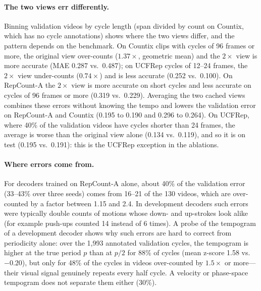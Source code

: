 \paragraph{The two views err differently.}
Binning validation videos by cycle length (span divided by count on Countix,
which has no cycle annotations) shows where the two views differ, and the
pattern depends on the benchmark. On Countix clips with cycles of 96 frames or
more, the original view over-counts ($1.37\times$, geometric mean) and the
$2\times$ view is more accurate (MAE 0.287 vs.\ 0.487); on UCFRep cycles of
12--24 frames, the $2\times$ view under-counts ($0.74\times$) and is less
accurate (0.252 vs.\ 0.100). On RepCount-A the $2\times$ view is more accurate
on short cycles and less accurate on cycles of 96 frames or more (0.319 vs.\
0.229). Averaging the two cached views combines these errors without knowing
the tempo and lowers the validation error on RepCount-A and Countix (0.195 to
0.190 and 0.296 to 0.264). On UCFRep, where 40\% of the validation videos have
cycles shorter than 24 frames, the average is worse than the original view alone
(0.134 vs.\ 0.119), and so it is on test (0.195 vs.\ 0.191): this is the UCFRep
exception in the ablations.

\paragraph{Where errors come from.}
For decoders trained on RepCount-A alone, about 40\% of the validation error
(33--43\% over three seeds) comes from 16--21 of the 130 videos, which are
over-counted by a factor between 1.15 and 2.4. In development decoders such
errors were typically double counts of motions whose down- and up-strokes look
alike (for example push-ups counted 14 instead of 6 times).
A probe of the tempogram of a development decoder shows why such errors are hard to
correct from periodicity alone: over the 1{,}993 annotated validation cycles, the
tempogram is higher at the true period $p$ than at $p/2$ for 88\% of cycles (mean
z-score 1.58 vs.\ $-0.20$), but only for 48\% of the cycles in videos
over-counted by $1.5\times$ or more---their visual signal genuinely repeats every
half cycle. A velocity or phase-space tempogram does not separate them either
(30\%).
